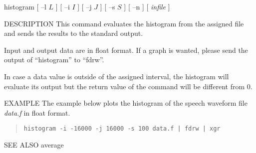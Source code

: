 
\begin{synopsis}
\item [histogram] [ --l $L$ ] [ --i $I$ ] [ --j $J$ ] [ --s $S$ ] [ --n ] 
                  [ {\em infile} ] 
\end{synopsis}

\begin{qsection}{DESCRIPTION}
This command evaluates the histogram from the assigned file
and sends the results to the standard output.
\par
Input and output data are in float format.
If a graph is wanted, please send the output of ``histogram'' to ``fdrw''.
\par
In case a data value is outside of the assigned interval,
the histogram will evaluate its output but the return value of
the command will be different from $0$.
\end{qsection}

\begin{options}
\end{options}

\begin{qsection}{EXAMPLE}
The example below plots the histogram of the speech waveform file
{\em data.f} in float format.
\begin{quote}
 \verb!histogram -i -16000 -j 16000 -s 100 data.f | fdrw | xgr!
\end{quote} 
\end{qsection}

\begin{qsection}{SEE ALSO}
 average
\end{qsection}

